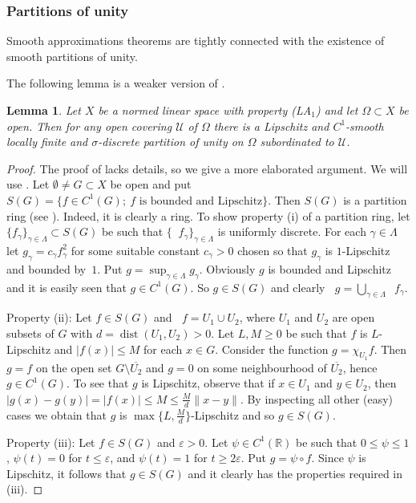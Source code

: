 \documentclass[a4paper,twoside,10pt,reqno,draft]{amsart}
\let\comp=\circ
\newtheorem{lemma}[theorem]{Lemma}
\theoremstyle{definition}
\theoremstyle{remark}
\newcommand\setsep{;\allowbreak\ } %
\newcommand\abs[1]{\mathopen|#1\mathclose|}
\newcommand\norm[1]{\mathopen\|#1\mathclose\|}
\newcommand\ga{\gamma}
\newcommand\ve{\varepsilon}
\newcommand\Om{\Omega}
\newcommand\sg{\sigma}
\newcommand\R{{\mathbb R}}
\newcommand\mc{\mathcal}
\DeclareMathOperator{\suppo}{supp_o}
\DeclareMathOperator{\dist}{dist}
\newcommand\pLA[1]{(LA$_#1$)}
\begin{document}
\subsubsection{Partitions of unity}

Smooth approximations theorems are tightly connected with the existence of smooth partitions of unity.

The following lemma is a weaker version of \cite[Lemma~7.85]{HJ}.
\begin{lemma}\label{l:LA->partitions}
Let $X$ be a normed linear space with property \pLA1 and let $\Om\subset X$ be open.
Then for any open covering $\mc U$ of $\Om$ there is a Lipschitz and $C^1$-smooth locally finite and $\sg$-discrete partition of unity on $\Om$ subordinated to $\mc U$.
\end{lemma}
\begin{proof}
The proof of \cite[Lemma~7.85]{HJ} lacks details, so we give a more elaborated argument.
We will use \cite[Lemma~7.49]{HJ}.
Let $\emptyset\neq G\subset X$ be open and put $S(G)=\{f\in C^1(G)\setsep\text{$f$ is bounded and Lipschitz}\}$.
Then $S(G)$ is a partition ring (see \cite[Definition~7.47]{HJ}).
Indeed, it is clearly a ring.
To show property (i) of a partition ring, let $\{f_\ga\}_{\ga\in\Lambda}\subset S(G)$ be such that $\{\suppo f_\ga\}_{\ga\in\Lambda}$ is uniformly discrete.
For each $\ga\in\Lambda$ let $g_\ga=c_\ga f_\ga^2$ for some suitable constant $c_\ga>0$ chosen so that $g_\ga$ is $1$-Lipschitz and bounded by~$1$.
Put $g=\sup_{\ga\in\Lambda}g_\ga$.
Obviously $g$ is bounded and Lipschitz and it is easily seen that $g\in C^1(G)$.
So $g\in S(G)$ and clearly $\suppo g=\bigcup_{\ga\in\Lambda}\suppo f_\ga$.

Property (ii):
Let $f\in S(G)$ and $\suppo f=U_1\cup U_2$, where $U_1$ and $U_2$ are open subsets of $G$ with $d=\dist(U_1,U_2)>0$.
Let $L,M\ge0$ be such that $f$ is $L$-Lipschitz and $\abs{f(x)}\le M$ for each $x\in G$.
Consider the function $g=\chi_{U_1}f$.
Then $g=f$ on the open set $G\setminus\overline{U_2}$ and $g=0$ on some neighbourhood of $\overline{U_2}$, hence $g\in C^1(G)$.
To see that $g$ is Lipschitz, observe that if $x\in U_1$ and $y\in U_2$, then $\abs{g(x)-g(y)}=\abs{f(x)}\le M\le\frac Md\norm{x-y}$.
By inspecting all other (easy) cases we obtain that $g$ is $\max\bigl\{L,\frac Md\bigr\}$-Lipschitz and so $g\in S(G)$.

Property (iii):
Let $f\in S(G)$ and $\ve>0$.
Let $\psi\in C^1(\R)$ be such that $0\le\psi\le1$, $\psi(t)=0$ for $t\le\ve$, and $\psi(t)=1$ for $t\ge2\ve$.
Put $g=\psi\comp f$.
Since $\psi$ is Lipschitz, it follows that $g\in S(G)$ and it clearly has the properties required in (iii).


\end{proof}
\end{document}
